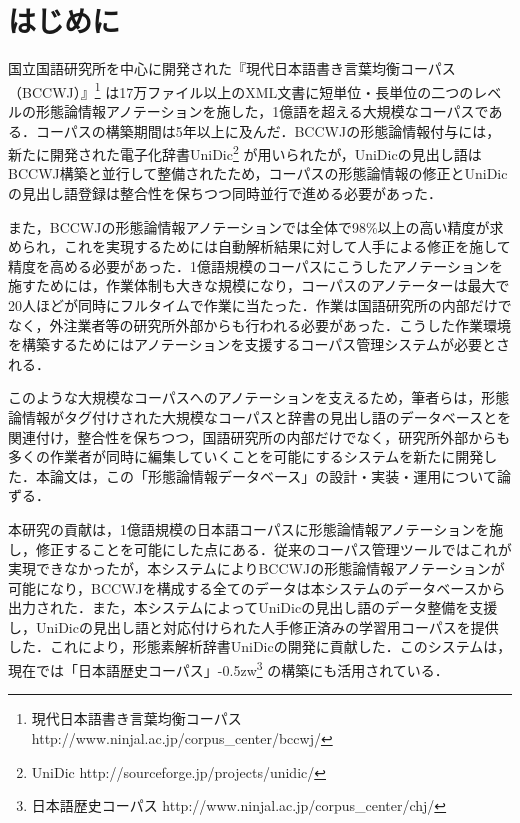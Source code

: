 \documentclass[japanese]{jnlp_1.4}
\begin{document}
\maketitle

\section{はじめに}
\label{sec:introduction}

国立国語研究所を中心に開発された『現代日本語書き言葉均衡コーパス（BCCWJ）』\cite{前川2008}\footnote{現代日本語書き言葉均衡コーパス http://www.ninjal.ac.jp/corpus\_center/bccwj/} は17万ファイル以上のXML文書に短単位・長単位の二つのレベルの形態論情報アノテーションを施した，1億語を超える大規模なコーパスである．コーパスの構築期間は5年以上に及んだ．BCCWJの形態論情報付与には，新たに開発された電子化辞書UniDic\footnote{UniDic http://sourceforge.jp/projects/unidic/} が用いられたが，UniDicの見出し語はBCCWJ構築と並行して整備されたため，コーパスの形態論情報の修正とUniDicの見出し語登録は整合性を保ちつつ同時並行で進める必要があった．

また，BCCWJの形態論情報アノテーションでは全体で98\%以上の高い精度が求められ，これを実現するためには自動解析結果に対して人手による修正を施して精度を高める必要があった．1億語規模のコーパスにこうしたアノテーションを施すためには，作業体制も大きな規模になり，コーパスのアノテーターは最大で20人ほどが同時にフルタイムで作業に当たった．作業は国語研究所の内部だけでなく，外注業者等の研究所外部からも行われる必要があった．こうした作業環境を構築するためにはアノテーションを支援するコーパス管理システムが必要とされる．

このような大規模なコーパスへのアノテーションを支えるため，筆者らは，形態論情報がタグ付けされた大規模なコーパスと辞書の見出し語のデータベースとを関連付け，整合性を保ちつつ，国語研究所の内部だけでなく，研究所外部からも多くの作業者が同時に編集していくことを可能にするシステムを新たに開発した．本論文は，この「形態論情報データベース」の設計・実装・運用について論ずる．

本研究の貢献は，1億語規模の日本語コーパスに形態論情報アノテーションを施し，修正することを可能にした点にある．従来のコーパス管理ツールではこれが実現できなかったが，本システムによりBCCWJの形態論情報アノテーションが可能になり，BCCWJを構成する全てのデータは本システムのデータベースから出力された．また，本システムによってUniDicの見出し語のデータ整備を支援し，UniDicの見出し語と対応付けられた人手修正済みの学習用コーパスを提供した．これにより，形態素解析辞書UniDicの開発に貢献した．このシステムは，現在では「日本語歴史コーパス」{\kern-0.5zw}\footnote{日本語歴史コーパス http://www.ninjal.ac.jp/corpus\_center/chj/} の構築にも活用されている．
\end{document}
